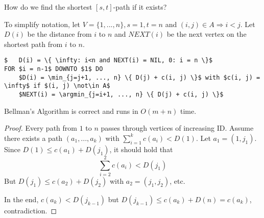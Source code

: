 \begin{qstn}
How do we find the shortest $[s, t]$-path if it exists?
\end{qstn}
To simplify notation, let $V = \{1, ..., n\}, s=1, t=n$ and $(i, j) \in A \Rightarrow i < j$.
Let $D(i)$ be the distance from $i$ to $n$ and $NEXT(i)$ be the next vertex on the shortest path from $i$ to $n$.

\begin{lstlisting}
$	D(i) = \{ \infty: i<n and NEXT(i) = NIL, 0: i = n \}$
FOR $i = n-1$ DOWNTO $1$ DO
	$D(i) = \min_{j=j+1, ..., n} \{ D(j) + c(i, j) \}$ with $c(i, j) = \infty$ if $(i, j) \not\in A$
	$NEXT(i) = \argmin_{j=i+1, ..., n} \{ D(j) + c(i, j) \}$
\end{lstlisting}

\begin{thm}
Bellman's Algorithm is correct and runs in $O(m + n)$ time.
\end{thm}
\begin{proof}
Every path from $1$ to $n$ passes through vertices of increasing ID. Assume there exists a path $(a_1, ..., a_k)$ with $\sum_{i=1}^k c(a_i) < D(1)$.
Let $a_1 = (1, j_1)$. Since $D(1) \leq c(a_1) + D(j_1)$, it should hold that
\[ \sum\limits_{i=2}^2 c(a_i) < D(j_1) \]
But $D(j_1) \leq c(a_2) + D(j_2)$ with $a_2 = (j_1, j_2)$, etc.

In the end, $c(a_k) < D(j_{k-1})$ but $D(j_{k-1}) \leq c(a_k) + D(n) = c(a_k)$, contradiction.
\end{proof}
